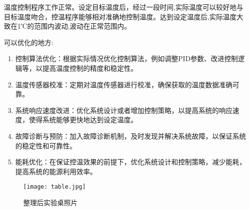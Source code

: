 \documentclass[dvipsnames, svgnames,a4paper,11pt]{article}
\begin{document}
    温度控制程序工作正常。设定目标温度后，经过一段时间,实际温度可以较好地与目标温度吻合，控温程序能够相对准确地控制温度。达到设定温度后,实际温度大致在1℃的范围内波动,波动在正常范围内。

    可以优化的地方:

        \begin{enumerate}
            \item 控制算法优化：根据实际情况优化控制算法，例如调整PID参数、改进控制逻辑等，以提高温度控制的精度和稳定性。
            \item 温度传感器校准：定期对温度传感器进行校准，确保获取的温度数据准确可靠。
            \item 系统响应速度改进：优化系统设计或者增加控制策略，以提高系统的响应速度，使得系统能够更快地达到设定温度。
            \item 故障诊断与预防：加入故障诊断机制，及时发现并解决系统故障，以保证系统的稳定性和可靠性。
            \item 能耗优化：在保证控温效果的前提下，优化系统设计和控制策略，减少能耗，提高系统的能源利用效率。
        \end{enumerate}




        \begin{figure}[htbp]
            \centering
            \texttt{[image: table.jpg]}
            \caption{整理后实验桌照片}
            \label{fig:table}
        \end{figure}
\end{document}
